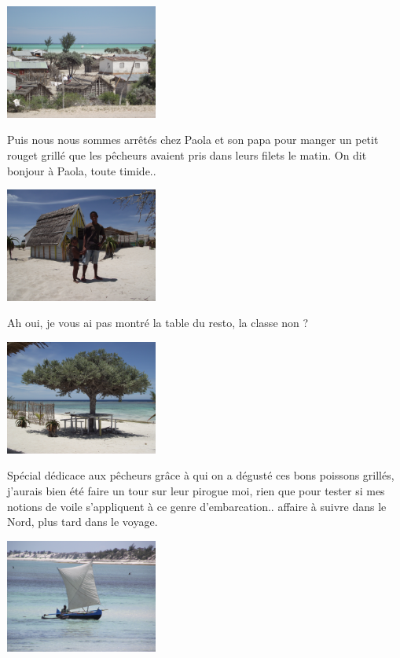 \begin{multicols}{2}
\smallbreak\smallbreak
\hspace*{-0.65cm}
\includegraphics[width=5cm]{articles/Chemins-du-sud/DSCF0306.JPG}
\smallbreak

Puis nous nous sommes arrêtés chez Paola et son papa pour manger un petit rouget grillé que les pêcheurs avaient pris dans leurs filets le matin. On dit bonjour à Paola, toute timide..

\smallbreak\smallbreak
\hspace*{-0.65cm}
\includegraphics[width=5cm]{articles/Chemins-du-sud/DSCF0310.JPG}
\smallbreak

Ah oui, je vous ai pas montré la table du resto, la classe non ?

\smallbreak\smallbreak
\hspace*{-0.65cm}
\includegraphics[width=5cm]{articles/Chemins-du-sud/DSCF0316.JPG}
\smallbreak

Spécial dédicace aux pêcheurs grâce à qui on a dégusté ces bons poissons grillés, j'aurais bien été faire un tour sur leur pirogue moi, rien que pour tester si mes notions de voile s'appliquent à ce genre d'embarcation.. affaire à suivre dans le Nord, plus tard dans le voyage.

\smallbreak\smallbreak
\hspace*{-0.65cm}
\includegraphics[width=5cm]{articles/Chemins-du-sud/DSCF0319.JPG}
\smallbreak


\end{multicols}
